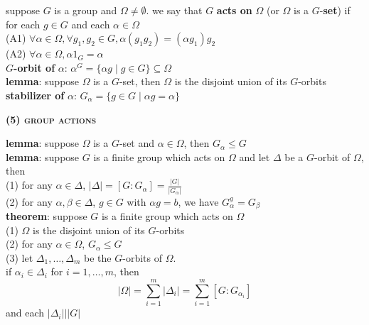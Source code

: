 \documentclass[a4paper]{article}
\newcommand\abs[1]{\ensuremath{\lvert#1\rvert}}
\newcommand\divides{\ensuremath{\big|}}
\begin{document}
\begin{multicols}{2}
\begin{framed}
	\noindent
	suppose $G$ is a group and $\Omega \neq \emptyset$. we say that $G$ \textbf{acts on} $\Omega$ (or $\Omega$ is a $G$-\textbf{set}) if for each $g \in G$ and each $\alpha \in \Omega$\\
	(A1) $\forall \alpha \in \Omega, \forall g_1, g_2 \in G, \alpha(g_1g_2) = (\alpha g_1)g_2$\\
	(A2) $\forall \alpha \in \Omega, \alpha 1_G = \alpha$\\
	
	\noindent
	$G$\textbf{-orbit of} $\alpha$: $\alpha^G = \{\alpha g \; \vert \; g \in G\} \subseteq \Omega$\\
	
	\noindent
	\textbf{lemma}: suppose $\Omega$ is a $G$-set, then $\Omega$ is the disjoint union of its $G$-orbits\\
	
	\noindent
	\textbf{stabilizer of} $\alpha$: $G_\alpha = \{g \in G \; \vert \; \alpha g = \alpha\}$
\end{framed}

\begin{framed}
	\begin{center}
		\textbf{\textsc{(5) group actions}}
	\end{center}
	
	\noindent
	\textbf{lemma}: suppose $\Omega$ is a $G$-set and $\alpha \in \Omega$, then $G_\alpha \leq G$\\
	
	\noindent
	\textbf{lemma}: suppose $G$ is a finite group which acts on $\Omega$ and let $\Delta$ be a $G$-orbit of $\Omega$, then\\
	(1) for any $\alpha \in \Delta$, $\abs{\Delta} = [G:G_\alpha] = \frac{\abs{G}}{\abs{G_\alpha}}$\\
	(2) for any $\alpha, \beta \in \Delta$, $g \in G$ with $\alpha g = b$, we have $G_\alpha^g = G_\beta$\\
	
	\noindent
	\textbf{theorem}: suppose $G$ is a finite group which acts on $\Omega$\\
	(1) $\Omega$ is the disjoint union of its $G$-orbits\\
	(2) for any $\alpha \in \Omega$, $G_\alpha \leq G$\\
	(3) let $\Delta_1, \dots, \Delta_m$ be the $G$-orbits of $\Omega$. \\
	if $\alpha_i \in \Delta_i$ for $i = 1, \dots, m$, then
	$$\abs{\Omega} = \sum_{i=1}^m \abs{\Delta_i} = \sum_{i=1}^m [G: G_{\alpha_i}]$$
	and each $\abs{\Delta_i} \divides \abs{G}$\\
	

\end{framed}
\end{multicols}
\end{document}
